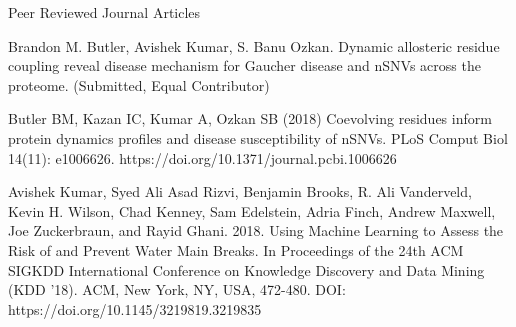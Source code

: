 \begin{cventries}
\cventry
    {}
    {Peer Reviewed Journal Articles}
    {}
    {}
    {
\begin{cvitems}
    \setlength\itemsep{.5em}
    \small
    \item Brandon M. Butler, Avishek Kumar, S. Banu Ozkan. Dynamic allosteric residue coupling reveal disease mechanism for Gaucher disease and nSNVs across the proteome. (Submitted, Equal Contributor)
    \item Butler BM, Kazan IC, Kumar A, Ozkan SB (2018) Coevolving residues inform protein dynamics profiles and disease susceptibility of nSNVs. PLoS Comput Biol 14(11): e1006626. https://doi.org/10.1371/journal.pcbi.1006626
    \item Avishek Kumar, Syed Ali Asad Rizvi, Benjamin Brooks, R. Ali Vanderveld, Kevin H. Wilson, Chad
Kenney, Sam Edelstein, Adria Finch, Andrew Maxwell, Joe Zuckerbraun, and Rayid Ghani. 2018.
Using Machine Learning to Assess the Risk of and Prevent Water Main Breaks. In Proceedings of the
24th ACM SIGKDD International Conference on Knowledge Discovery and Data Mining (KDD '18).
ACM, New York, NY, USA, 472-480. DOI: https://doi.org/10.1145/3219819.3219835
\end{cvitems}
}


\end{cventries}
